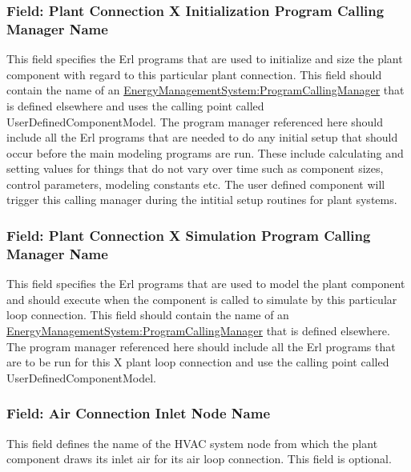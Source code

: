 \subsubsection{Field: Plant Connection X Initialization Program Calling Manager Name}\label{field-plant-connection-x-initialization-program-calling-manager-name}

This field specifies the Erl programs that are used to initialize and size the plant component with regard to this particular plant connection. This field should contain the name of an \hyperref[energymanagementsystemprogramcallingmanager]{\hyperref[energymanagementsystemprogram]{EnergyManagementSystem:Program}CallingManager} that is defined elsewhere and uses the calling point called UserDefinedComponentModel. The program manager referenced here should include all the Erl programs that are needed to do any initial setup that should occur before the main modeling programs are run. These include calculating and setting values for things that do not vary over time such as component sizes, control parameters, modeling constants etc. The user defined component will trigger this calling manager during the intitial setup routines for plant systems.

\subsubsection{Field: Plant Connection X Simulation Program Calling Manager Name}\label{field-plant-connection-x-simulation-program-calling-manager-name}

This field specifies the Erl programs that are used to model the plant component and should execute when the component is called to simulate by this particular loop connection. This field should contain the name of an \hyperref[energymanagementsystemprogramcallingmanager]{\hyperref[energymanagementsystemprogram]{EnergyManagementSystem:Program}CallingManager} that is defined elsewhere. The program manager referenced here should include all the Erl programs that are to be run for this X plant loop connection and use the calling point called UserDefinedComponentModel.

\subsubsection{Field: Air Connection Inlet Node Name}\label{field-air-connection-inlet-node-name}

This field defines the name of the HVAC system node from which the plant component draws its inlet air for its air loop connection. This field is optional.

